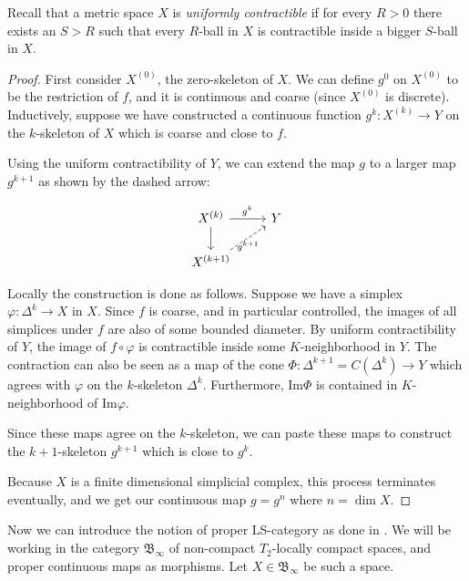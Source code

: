 \documentclass {amsart}
\newcommand {\binfty}   {\mathfrak{B}_{\infty}}
\newcommand {\im}       {\text{Im}}
\theoremstyle {definition}
\begin{document}
Recall that a metric space \( X \) is \emph{uniformly contractible} if for every
\( R > 0 \) there exists an \( S > R \) such that every \( R \)-ball in \( X \)
is contractible inside a bigger \( S \)-ball in \( X \).

\begin{proof}
    First consider \( X^{(0)} \), the zero-skeleton of \( X \). We can define \(
    g^{0} \) on \( X^{(0)} \) to be the restriction of \( f \), and it is
    continuous and coarse (since \( X^{(0)} \) is discrete). Inductively, suppose
    we have constructed a continuous function \( g^{k}: X^{(k)} \to Y \) on the \(
    k \)-skeleton of \( X \) which is coarse and close to \( f \).

    Using the uniform contractibility of \( Y \), we can extend the map \( g \) to
    a larger map \( g^{k+1} \) as shown by the dashed arrow:

    \begin{equation}
        \begin{tikzcd}
            X^{(k)} \arrow[r, "g^{k}"] \arrow[d] & Y \\
            X^{(k + 1)} \arrow[ur,dashed, "g^{k+1}" below] 
        \end{tikzcd}
    \end{equation}

    Locally the construction is done as follows. Suppose we have a simplex
    \( \varphi : \Delta ^k \to X \) in \( X \). Since \( f \) is coarse, and in
    particular controlled, the images of all simplices under \( f \) are also of
    some bounded diameter. By uniform contractibility of \( Y \),
    the image of \( f \circ \varphi \) is contractible inside some \( K
    \)-neighborhood in \( Y \). The contraction can also be seen as a map of the cone 
    \( \Phi : \Delta ^ {k+1} = C(\Delta ^k) \to Y \)
    which agrees with \( \varphi \) on the \( k \)-skeleton \( \Delta^k \).
    Furthermore, \( \im \Phi \) is contained in \( K \)-neighborhood of \( \im
    \varphi \).

    Since these maps agree on the \( k \)-skeleton, we can paste these maps to
    construct the \( k+1 \)-skeleton \( g^{k+1} \) which is close to \( g^k \).

    Because \( X \) is a finite dimensional simplicial complex, this process
    terminates eventually, and we get our continuous map \( g = g^{n} \) where
    \( n= \dim X \).
\end{proof}

Now we can introduce the notion of proper LS-category as done in
\cite{ayalaLusternikSchnirelmannInvariantsProper1992}. We will be working in
the category \( \binfty \) of non-compact \( T_2 \)-locally compact spaces, and
proper continuous maps as morphisms. Let \( X \in \binfty \) be such a space.
\end{document}
